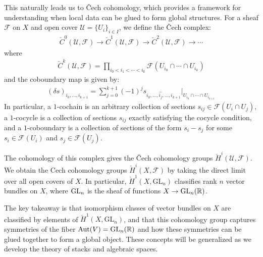 \documentclass[12pt]{article}
\begin{document}
This naturally leads us to Čech cohomology, which provides a framework for understanding when local data can be glued to form global structures. For a sheaf $\mathcal{F}$ on $X$ and open cover $\mathcal{U} = \{U_i\}_{i \in I}$, we define the Čech complex:
\begin{align*}
    \check{C}^0(\mathcal{U}, \mathcal{F}) \to \check{C}^1(\mathcal{U}, \mathcal{F}) \to \check{C}^2(\mathcal{U}, \mathcal{F}) \to \cdots
\end{align*} where
\begin{align*}
    \check{C}^k(\mathcal{U}, \mathcal{F}) = \prod_{i_0 < i_1 < \cdots < i_k} \mathcal{F}(U_{i_0} \cap \cdots \cap U_{i_k})
\end{align*} and the coboundary map is given by:
\begin{align*}
    (\delta s)_{i_0, \ldots, i_{k+1}} = \sum_{j=0}^{k+1} (-1)^j s_{i_0, \ldots, \hat{i_j}, \ldots, i_{k+1}}|_{U_{i_0} \cap \cdots \cap U_{i_{k+1}}}
\end{align*}
In particular, a $1$-cochain is an arbitrary collection of sections $s_{ij} \in \mathcal{F}(U_i \cap U_j)$, a $1$-cocycle is a collection of sections $s_{ij}$ exactly satisfying the cocycle condition, and a $1$-coboundary is a collection of sections of the form $s_i - s_j$ for some $s_i \in \mathcal{F}(U_i)$ and $s_j \in \mathcal{F}(U_j)$.

The cohomology of this complex gives the Čech cohomology groups $\check{H}^i(\mathcal{U}, \mathcal{F})$. We obtain the Cech cohomology groups $\check{H}^i(X, \mathcal{F})$ by taking the direct limit over all open covers of $X$. In particular, $\check{H}^1(X, \text{GL}_n)$ classifies rank $n$ vector bundles on $X$, where $\operatorname{GL}_n$ is the sheaf of functions $X \to \operatorname{GL}_n(\mathbb{R})$.

The key takeaway is that isomorphism classes of vector bundles on $X$ are classified by elements of $\check{H}^1(X, \text{GL}_n)$, and that this cohomology group captures symmetries of the fiber $\operatorname{Aut}(V) = \operatorname{GL}_n(\mathbb{R})$ and how these symmetries can be glued together to form a global object. These concepts will be generalized as we develop the theory of stacks and algebraic spaces.
\end{document}
